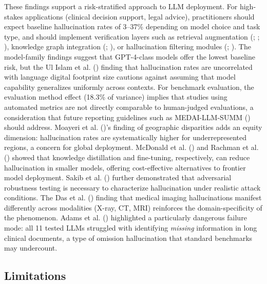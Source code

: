 \documentclass[
  11pt,
  a4paper,
]{article}
\begin{document}
These findings support a risk-stratified approach to LLM deployment. For
high-stakes applications (clinical decision support, legal advice),
practitioners should expect baseline hallucination rates of 3--37\%
depending on model choice and task type, and should implement
verification layers such as retrieval augmentation
(;
;
), knowledge graph integration
(;
), or hallucination filtering
modules (;
). The
model-family findings suggest that GPT-4-class models offer the lowest
baseline risk, but the Ul Islam et al.
() finding that hallucination rates are
uncorrelated with language digital footprint size cautions against
assuming that model capability generalizes uniformly across contexts.
For benchmark evaluation, the evaluation method effect (18.3\% of
variance) implies that studies using automated metrics are not directly
comparable to human-judged evaluations, a consideration that future
reporting guidelines such as MEDAI-LLM-SUMM
() should address.
Moayeri et al. ()'s finding of
geographic disparities adds an equity dimension: hallucination rates are
systematically higher for underrepresented regions, a concern for global
deployment. McDonald et al. () and
Rachman et al. () showed that knowledge
distillation and fine-tuning, respectively, can reduce hallucination in
smaller models, offering cost-effective alternatives to frontier model
deployment. Sakib et al. () further
demonstrated that adversarial robustness testing is necessary to
characterize hallucination under realistic attack conditions. The Das et
al. () finding that medical imaging
hallucinations manifest differently across modalities (X-ray, CT, MRI)
reinforces the domain-specificity of the phenomenon. Adams et al.
() highlighted a particularly dangerous
failure mode: all 11 tested LLMs struggled with identifying
\emph{missing} information in long clinical documents, a type of
omission hallucination that standard benchmarks may undercount.

\subsection{Limitations}\label{limitations}
\end{document}
